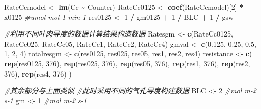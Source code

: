 \documentclass[
]{krantz}
\makeatletter
\newenvironment{Shaded}{\begin{snugshade}}{\end{snugshade}}
\newcommand{\CommentTok}[1]{\textcolor[rgb]{0.56,0.35,0.01}{\textit{#1}}}
\newcommand{\DecValTok}[1]{\textcolor[rgb]{0.00,0.00,0.81}{#1}}
\newcommand{\FloatTok}[1]{\textcolor[rgb]{0.00,0.00,0.81}{#1}}
\newcommand{\KeywordTok}[1]{\textcolor[rgb]{0.13,0.29,0.53}{\textbf{#1}}}
\newcommand{\NormalTok}[1]{#1}
\newcommand{\OperatorTok}[1]{\textcolor[rgb]{0.81,0.36,0.00}{\textbf{#1}}}
\newcommand{\StringTok}[1]{\textcolor[rgb]{0.31,0.60,0.02}{#1}}
\newenvironment{kframe}{%
\medskip{}
\setlength{\fboxsep}{.8em}
 \def\at@end@of@kframe{}%
 \ifinner\ifhmode%
  \def\at@end@of@kframe{\end{minipage}}%
  \begin{minipage}{\columnwidth}%
 \fi\fi%
 \def\FrameCommand##1{\hskip\@totalleftmargin \hskip-\fboxsep
 \colorbox{shadecolor}{##1}\hskip-\fboxsep
     \hskip-\linewidth \hskip-\@totalleftmargin \hskip\columnwidth}%
 \MakeFramed {\advance\hsize-\width
   \@totalleftmargin\z@ \linewidth\hsize
   \@setminipage}}%
 {\par\unskip\endMakeFramed%
 \at@end@of@kframe}
\renewenvironment{Shaded}{\begin{kframe}}{\end{kframe}}
\makeatother
\begin{document}
\begin{Shaded}
\begin{Highlighting}[]
\NormalTok{RateCcmodel \textless{}{-}}\StringTok{ }\KeywordTok{lm}\NormalTok{(Cc }\OperatorTok{\textasciitilde{}}\StringTok{ }\NormalTok{Counter)}
\NormalTok{RateCc0125 \textless{}{-}}\StringTok{ }\KeywordTok{coef}\NormalTok{(RateCcmodel)[}\DecValTok{2}\NormalTok{] }\OperatorTok{*}\StringTok{ }\NormalTok{x0125 }\CommentTok{\#umol mol{-}1 min{-}1}
\NormalTok{res0125 \textless{}{-}}\StringTok{ }\DecValTok{1} \OperatorTok{/}\StringTok{ }\NormalTok{gm0125 }\OperatorTok{+}\StringTok{ }\DecValTok{1} \OperatorTok{/}\StringTok{ }\NormalTok{BLC }\OperatorTok{+}\StringTok{ }\DecValTok{1} \OperatorTok{/}\StringTok{ }\NormalTok{gsw}

\CommentTok{\#利用不同叶肉导度的数据计算结果构造数据}
\NormalTok{Ratesgm \textless{}{-}}
\StringTok{  }\KeywordTok{c}\NormalTok{(RateCc0125, RateCc025, RateCc05, RateCc1, RateCc2, RateCc4)}
\NormalTok{gmval \textless{}{-}}\StringTok{ }\KeywordTok{c}\NormalTok{(}\FloatTok{0.125}\NormalTok{, }\FloatTok{0.25}\NormalTok{, }\FloatTok{0.5}\NormalTok{, }\DecValTok{1}\NormalTok{, }\DecValTok{2}\NormalTok{, }\DecValTok{4}\NormalTok{)}
\NormalTok{totalresgm \textless{}{-}}\StringTok{ }\KeywordTok{c}\NormalTok{(res0125, res025, res05, res1, res2, res4)}
\NormalTok{resistance \textless{}{-}}
\StringTok{  }\KeywordTok{c}\NormalTok{(}
    \KeywordTok{rep}\NormalTok{(res0125, }\DecValTok{376}\NormalTok{),}
    \KeywordTok{rep}\NormalTok{(res025, }\DecValTok{376}\NormalTok{),}
    \KeywordTok{rep}\NormalTok{(res05, }\DecValTok{376}\NormalTok{),}
    \KeywordTok{rep}\NormalTok{(res1, }\DecValTok{376}\NormalTok{),}
    \KeywordTok{rep}\NormalTok{(res2, }\DecValTok{376}\NormalTok{),}
    \KeywordTok{rep}\NormalTok{(res4, }\DecValTok{376}\NormalTok{)}
\NormalTok{  )}

\CommentTok{\#其余部分与上面类似}
\CommentTok{\#此时采用不同的气孔导度构建数据}
\NormalTok{BLC \textless{}{-}}\StringTok{ }\DecValTok{2} \CommentTok{\#mol m{-}2 s{-}1}
\NormalTok{gm \textless{}{-}}\StringTok{ }\DecValTok{1} \CommentTok{\#mol m{-}2 s{-}1}


\end{Highlighting}
\end{Shaded}
\end{document}
